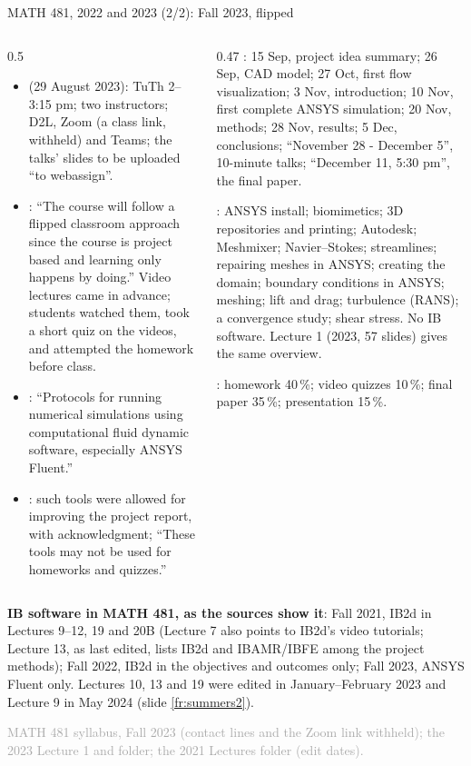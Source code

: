 \documentclass[aspectratio=169,11pt]{beamer}
\newcommand{\sourcecredit}[1]{\vfill\begin{flushright}\tiny\textcolor{DarkGray}{#1}\end{flushright}}
\begin{document}
\begin{frame}{MATH 481, 2022 and 2023 (2/2): Fall 2023, flipped}
\label{fr:m481e}
\begin{columns}[T,onlytextwidth]
\begin{column}{0.5\textwidth}
\scriptsize
\begin{itemize}\setlength{\itemsep}{0.5pt}
  \item {} (29 August 2023): TuTh 2--3:15 pm; two instructors; D2L, Zoom (a class link, withheld) and Teams; the talks' slides to be uploaded ``to webassign''.
  \item {}: ``The course will follow a flipped classroom approach since the course is project based and learning only happens by doing.'' Video lectures came in advance; students watched them, took a short quiz on the videos, and attempted the homework before class.
  \item {}: ``Protocols for running numerical simulations using computational fluid dynamic software, especially ANSYS Fluent.''
  \item {}: such tools were allowed for improving the project report, with acknowledgment; ``These tools may not be used for homeworks and quizzes.''
\end{itemize}
\end{column}
\begin{column}{0.47\textwidth}
\scriptsize
{}: 15 Sep, project idea summary; 26 Sep, CAD model; 27 Oct, first flow visualization; 3 Nov, introduction; 10 Nov, first complete ANSYS simulation; 20 Nov, methods; 28 Nov, results; 5 Dec, conclusions; ``November 28 - December 5'', 10-minute talks; ``December 11, 5:30 pm'', the final paper.

\vspace{0.8mm}
: ANSYS install; biomimetics; 3D repositories and printing; Autodesk; Meshmixer; Navier--Stokes; streamlines; repairing meshes in ANSYS; creating the domain; boundary conditions in ANSYS; meshing; lift and drag; turbulence (RANS); a convergence study; shear stress. No IB software. Lecture 1 (2023, 57 slides) gives the same overview.

\vspace{0.8mm}
: homework 40\,\%; video quizzes 10\,\%; final paper 35\,\%; presentation 15\,\%.
\end{column}
\end{columns}
\begin{punchbox}
\scriptsize \textbf{IB software in MATH 481, as the sources show it}: Fall 2021, IB2d in Lectures 9--12, 19 and 20B (Lecture 7 also points to IB2d's video tutorials; Lecture 13, as last edited, lists IB2d and IBAMR/IBFE among the project methods); Fall 2022, IB2d in the objectives and outcomes only; Fall 2023, ANSYS Fluent only. Lectures 10, 13 and 19 were edited in January--February 2023 and Lecture 9 in May 2024 (slide \ref{fr:summers2}).
\end{punchbox}
\sourcecredit{MATH 481 syllabus, Fall 2023 (contact lines and the Zoom link withheld); the 2023 Lecture 1 and folder; the 2021 Lectures folder (edit dates).}
\end{frame}
\end{document}
